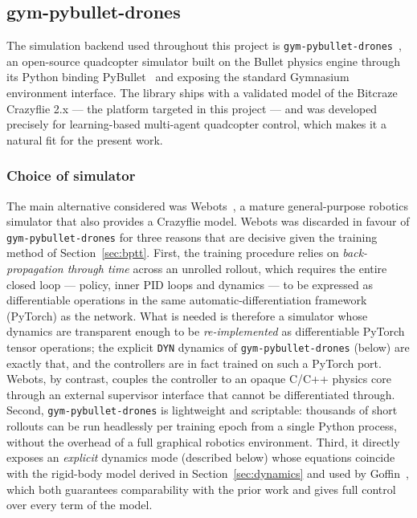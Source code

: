 \documentclass[11pt,a4paper]{article}
\theoremstyle{remark}
\numberwithin{equation}{section}
\begin{document}
\subsection{gym-pybullet-drones}\label{sec:gym_pybullet}

The simulation backend used throughout this project is
\texttt{gym-pybullet-drones}~\cite{panerati2021}, an open-source quadcopter
simulator built on the Bullet physics engine through its Python binding
PyBullet~\cite{coumans2021pybullet} and exposing the standard Gymnasium
environment interface. The library ships with a validated model of the
Bitcraze Crazyflie 2.x --- the platform targeted in this project --- and was
developed precisely for learning-based multi-agent quadcopter control, which
makes it a natural fit for the present work.

\subsubsection*{Choice of simulator}

The main alternative considered was Webots~\cite{michel2004webots}, a mature
general-purpose robotics simulator that also provides a Crazyflie model. Webots
was discarded in favour of \texttt{gym-pybullet-drones} for three reasons that
are decisive given the training method of Section~\ref{sec:bptt}. First, the
training procedure relies on \emph{back-propagation through time} across an
unrolled rollout, which requires the entire closed loop --- policy, inner PID
loops and dynamics --- to be expressed as differentiable operations in the same
automatic-differentiation framework (PyTorch) as the network. What is needed is
therefore a simulator whose dynamics are transparent enough to be
\emph{re-implemented} as differentiable PyTorch tensor operations; the explicit
\texttt{DYN} dynamics of \texttt{gym-pybullet-drones} (below) are exactly that,
and the controllers are in fact trained on such a PyTorch port. Webots, by
contrast, couples the controller to an opaque C/C++ physics core through an
external supervisor interface that cannot be differentiated through. Second,
\texttt{gym-pybullet-drones} is
lightweight and scriptable: thousands of short rollouts can be run headlessly
per training epoch from a single Python process, without the overhead of a
full graphical robotics environment. Third, it directly exposes an
\emph{explicit} dynamics mode (described below) whose equations coincide with
the rigid-body model derived in Section~\ref{sec:dynamics} and used by
Goffin~\cite{goffin2026}, which both guarantees comparability with the prior
work and gives full control over every term of the model.
\end{document}
